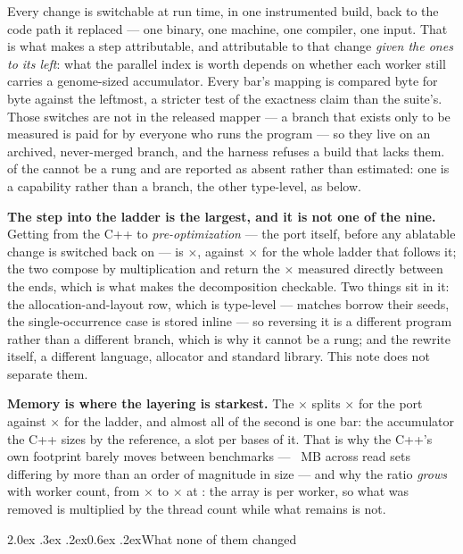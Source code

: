 \documentclass[10pt,a4paper,twocolumn]{article}
\makeatletter
\renewcommand\section{\@startsection{section}{1}{0pt}%
  {2.0ex \@plus .3ex \@minus .2ex}{0.6ex \@plus.2ex}{\normalsize\bfseries}}
\makeatother
\begin{document}
Every change is switchable at run time, in one instrumented build, back to the
code path it replaced --- one binary, one machine, one compiler, one input.
That is what makes a step
attributable, and attributable to that change \emph{given the ones to its
left}: what the parallel index is worth depends on whether each worker still
carries a genome-sized accumulator. Every bar's mapping is compared byte for
byte against the leftmost, a stricter test of the exactness claim than the
suite's. Those switches are not in the released mapper --- a branch that exists
only to be measured is paid for by everyone who runs the program --- so they
live on an
archived, never-merged branch, and the harness refuses a build that lacks them.
\shmAblNotRungs{} of the \shmNumOptimizations{} cannot be a rung and are
reported as absent rather than estimated: one is a capability rather than a
branch, the other type-level, as below.

\textbf{The step into the ladder is the largest, and it is not one of the
nine.} Getting from the C++ to \emph{pre-optimization} --- the port itself,
before any ablatable change is switched back on --- is \shmAblPortX$\times$,
against \shmAblLadderX$\times$ for the whole ladder that follows it; the two
compose by multiplication and return the \shmAblTotalX$\times$ measured
directly between the ends, which is what makes the decomposition checkable.
Two things sit in it: the allocation-and-layout row, which is type-level ---
matches borrow their seeds, the single-occurrence case is stored inline --- so
reversing it is a different program rather than a different branch, which is
why it cannot be a rung; and the rewrite itself, a different language,
allocator and standard library. This note does not separate them.

\textbf{Memory is where the layering is starkest.} The
\shmAblRssTotalX$\times$ splits \shmAblRssPortX$\times$ for the port against
\shmAblRssLadderX$\times$ for the ladder, and almost all of the second is one
bar: the accumulator the C++ sizes by the reference, a slot per
\shmMinHalflen{} bases of it. That is why the C++'s own footprint barely moves
between benchmarks --- \shmRssCppSpreadMB~MB across read sets differing by
more than an order of magnitude in size --- and why the ratio \emph{grows}
with worker count, from \shmAblRssRatioOne$\times$ to
\shmAblRssRatioMax$\times$ at \shmAblThreadsMax{}: the array is per worker, so
what was removed is multiplied by the thread count while what remains is not.

\section{What none of them changed}
\end{document}
